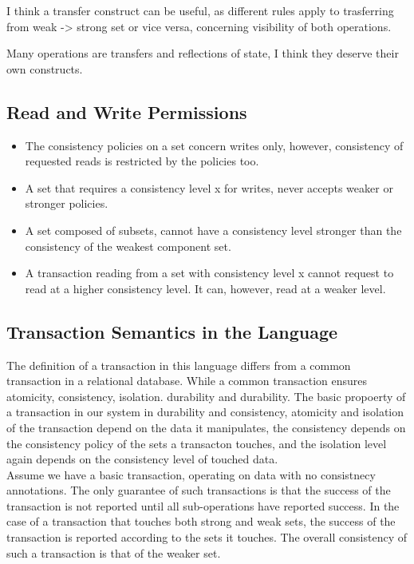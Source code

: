 I think a transfer construct can be useful, as different rules apply to
trasferring from weak -> strong set or vice versa, concerning visibility of both
operations. 

Many operations are transfers and reflections of state, I think they deserve
their own constructs.

\subsection{Read and Write Permissions}

\begin{itemize}

\item The consistency policies on a set concern writes only, however,
consistency of requested reads is restricted by the policies too.

\item A set that requires a consistency level x for writes, never accepts weaker or
stronger policies.

\item A set composed of subsets, cannot have a consistency level stronger than
the consistency of the weakest component set.

\item A transaction reading from a set with consistency level x cannot request
to read at a higher consistency level. It can, however, read at a weaker level.

\end{itemize}

\subsection{Transaction Semantics in the Language}
The definition of a transaction in this language differs from a common transaction in a
relational database. While a common transaction ensures atomicity, consistency, isolation.
durability and durability. The basic propoerty of a transaction in our system in
durability and consistency, atomicity and isolation of the transaction depend on
the data it manipulates, the consistency depends on the consistency policy of
the sets a transacton touches, and the isolation level again depends on the
consistency level of touched data. \\

Assume we have a basic transaction, operating on data with no consistnecy
annotations. The only guarantee of such transactions is that the success of the
transaction is not reported until all sub-operations have reported success. In
the case of a transaction that touches both strong and weak sets, the success
of the transaction is reported according to the sets it touches. The overall
consistency of such a transaction is that of the weaker set. 

